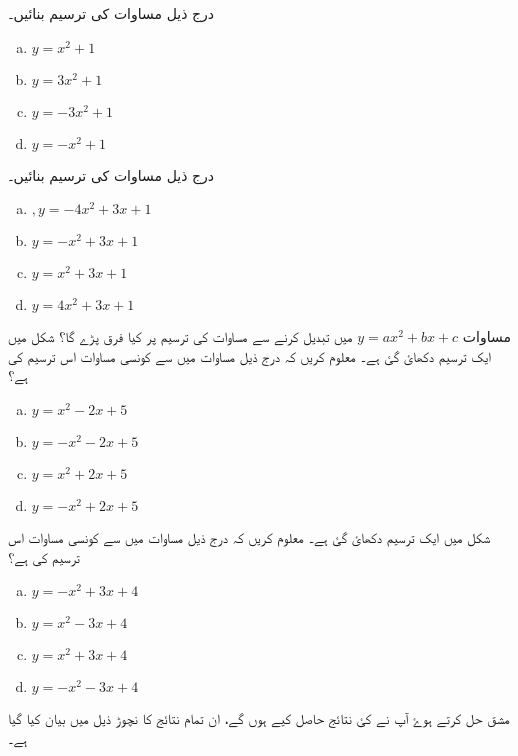 درج ذیل   مساوات کی ترسیم   بنائیں۔
\begin{multicols}{2}
\begin{enumerate}[a.]
\item \(y=x^{2}+1  \)
\item \( y=3x^{2}+1 \)
\item \(y=-3x^{2}+1  \)
\item \( y=-x^{2}+1 \)
 \end{enumerate}
\end{multicols}
درج ذیل   مساوات کی ترسیم   بنائیں۔
\begin{multicols}{2}
\begin{enumerate}[a.]
\item \(,y=-4x^{2}+3x+1  \)
\item \( y=-x^{2}+3x+1 \)
\item \(y=x^{2}+3x+1  \)
\item \(y=4x^{2}+3x+1 \)
 \end{enumerate}
\end{multicols}
مساوات  \(y=ax^{2}+bx+c\) میں  تبدیل کرنے سے مساوات  کی ترسیم پر کیا فرق پڑے گا؟
شکل میں ایک ترسیم دکھائ گئ ہے۔ معلوم کریں کہ درج ذیل مساوات میں سے کونسی مساوات اس ترسیم کی ہے؟
\begin{multicols}{3}
\begin{enumerate}[a.]
\item \(y=x^{2}-2x+5  \)
\item \( y=-x^{2}-2x+5 \)
\item \(y=x^{2}+2x+5  \)
\item \( y=-x^{2}+2x+5 \)
\end{enumerate}
\end{multicols}
شکل میں ایک ترسیم دکھائ گئ ہے۔ معلوم کریں کہ درج ذیل مساوات میں سے کونسی مساوات اس ترسیم کی ہے؟
\begin{multicols}{3}
\begin{enumerate}[a.]
\item \(y=-x^{2}+3x+4\)
\item \( y=x^{2}-3x+4 \)
\item \(y=x^{2}+3x+4  \)
\item \( y=-x^{2}-3x+4 \)
\end{enumerate}
\end{multicols}

مشق حل کرتے ہوۓ آپ نے کئ نتائج حاصل کیے ہوں گے، ان تمام نتائج کا نچوڑ ذیل میں بیان کیا گیا ہے۔

